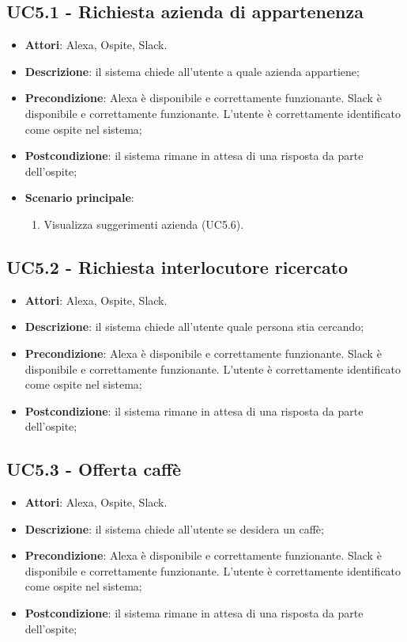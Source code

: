 \documentclass[../AnalisiDeiRequisiti.tex]{subfiles}
\begin{document}
\subsection{UC5.1 - Richiesta azienda di appartenenza} 
\label{sssec:UC5.1} 
\begin{itemize} 
\item \textbf{Attori}: Alexa, Ospite, Slack.
\item \textbf{Descrizione}: il sistema chiede all'utente a quale azienda appartiene;
\item \textbf{Precondizione}: Alexa è disponibile e correttamente funzionante. Slack è disponibile e correttamente funzionante. L'utente è correttamente identificato come ospite nel sistema;
\item \textbf{Postcondizione}: il sistema rimane in attesa di una risposta da parte dell'ospite;
\item \textbf{Scenario principale}: \begin{enumerate}\item Visualizza suggerimenti azienda (UC5.6). 
 \end{enumerate}
\end{itemize} 
\subsection{UC5.2 - Richiesta interlocutore ricercato} 
\label{sssec:UC5.2} 
\begin{itemize} 
\item \textbf{Attori}: Alexa, Ospite, Slack.
\item \textbf{Descrizione}: il sistema chiede all'utente quale persona stia cercando;
\item \textbf{Precondizione}: Alexa è disponibile e correttamente funzionante. Slack è disponibile e correttamente funzionante. L'utente è correttamente identificato come ospite nel sistema;
\item \textbf{Postcondizione}: il sistema rimane in attesa di una risposta da parte dell'ospite;
\end{itemize} 
\subsection{UC5.3 - Offerta caffè} 
\label{sssec:UC5.3} 
\begin{itemize} 
\item \textbf{Attori}: Alexa, Ospite, Slack.
\item \textbf{Descrizione}: il sistema chiede all'utente se desidera un caffè;
\item \textbf{Precondizione}: Alexa è disponibile e correttamente funzionante. Slack è disponibile e correttamente funzionante. L'utente è correttamente identificato come ospite nel sistema;
\item \textbf{Postcondizione}: il sistema rimane in attesa di una risposta da parte dell'ospite;
\end{itemize} 
\end{document}
